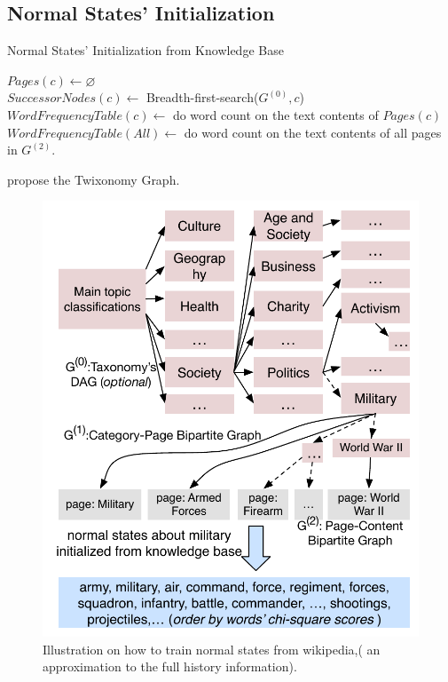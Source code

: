 \documentclass[conference,compsoc]{IEEEtran}
\begin{document}
\subsection{Normal States' Initialization}
\begin{algorithm}
\caption{Normal States' Initialization from Knowledge Base}
\label{alg:normalStatesInit}
\(Pages(c)\leftarrow \varnothing\)\\
\(SuccessorNodes(c) \leftarrow \) Breadth-first-search(\(G^{(0)},c\))\\
\(WordFrequencyTable(c) \leftarrow \) do word count on the text contents of \(Pages(c)\) \\
\(WordFrequencyTable(All) \leftarrow \) do word count on the text contents of all pages in \(G^{(2)}\).\\
\end{algorithm}

\cite{faralli2015large} propose the Twixonomy Graph. 

\begin{figure}
    \centering
    \includegraphics[width=1.0\columnwidth]{img/initializationExample.pdf}  
    \caption{Illustration on how to train normal states from wikipedia,( an approximation to the full history information).}
    \label{fig:modelDesc}
\end{figure}
\end{document}

